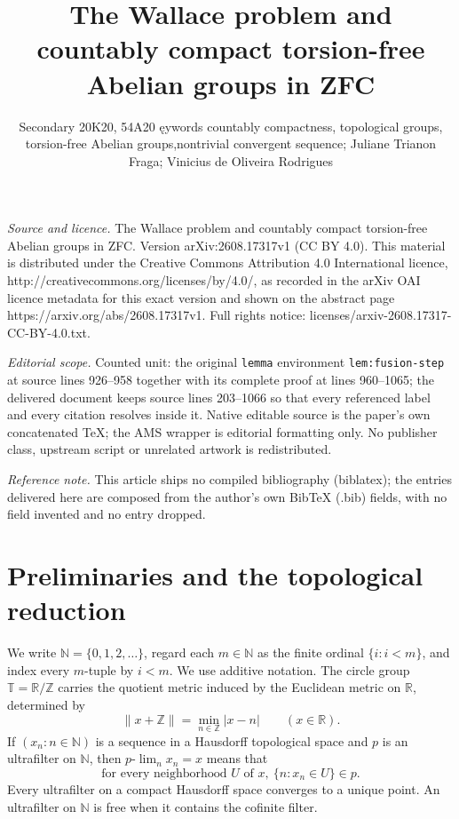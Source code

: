 \documentclass[10pt,a4paper]{amsart}
\newcommand{\T}{\mathbb T}
\newcommand{\N}{\mathbb N}
\begin{document}
\title[The Wallace problem and countably compact torsion-free Abeli]{The Wallace problem and countably compact torsion-free Abelian groups in ZFC}
\author{Secondary 20K20, 54A20 ęywords countably compactness, topological groups, torsion-free Abelian groups,nontrivial convergent sequence; Juliane Trianon Fraga; Vinicius de Oliveira Rodrigues}
\date{}
\maketitle
\noindent\emph{Source and licence.} The Wallace problem and countably compact torsion-free Abelian groups in ZFC. Version arXiv:2608.17317v1 (CC BY 4.0). This material is distributed under the Creative Commons Attribution 4.0 International licence, http://creativecommons.org/licenses/by/4.0/, as recorded in the arXiv OAI licence metadata for this exact version and shown on the abstract page https://arxiv.org/abs/2608.17317v1. Full rights notice: licenses/arxiv-2608.17317-CC-BY-4.0.txt.\par\smallskip
\noindent\textit{Editorial scope.} Counted unit: the original \texttt{lemma} environment \texttt{lem:fusion-step} at source lines 926--958 together with its complete proof at lines 960--1065; the delivered document keeps source lines 203--1066 so that every referenced label and every citation resolves inside it. Native editable source is the paper's own concatenated TeX; the AMS wrapper is editorial formatting only. No publisher class, upstream script or unrelated artwork is redistributed.
\par\smallskip\noindent\textit{Reference note.} This article ships no compiled bibliography (biblatex); the entries delivered here are composed from the author's own BibTeX (.bib) fields, with no field invented and no entry dropped.
\section{Preliminaries and the topological reduction}\label{sec:preliminaries}

We write $\N=\{0,1,2,\ldots\}$, regard each $m\in\N$ as the finite ordinal
$\{i:i<m\}$, and index every $m$-tuple by $i<m$.  We use additive notation.
The circle group
$\T=\mathbb R/\mathbb Z$ carries the quotient metric induced by the Euclidean
metric on $\mathbb R$, determined by
\[
 \|x+\mathbb Z\|=\min_{n\in\mathbb Z}|x-n|
 \qquad(x\in\mathbb R).
\]
If $(x_n:n\in\N)$ is a sequence in a Hausdorff topological space and $p$ is
an ultrafilter on $\N$, then
$p\text{-}\lim_n x_n=x$ means that
\[
 \text{for every neighborhood }U\text{ of }x,\ \{n:x_n\in U\}\in p.
\]
Every ultrafilter on a compact Hausdorff space converges to a unique point.
An ultrafilter on $\N$ is free when it
contains the cofinite filter.
\end{document}
